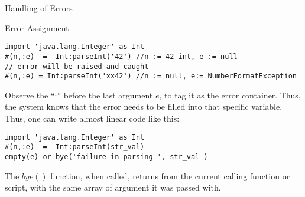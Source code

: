 \begin{section}{Handling of Errors}
\begin{subsection}{Error Assignment}
\begin{lstlisting}[style=JexlStyle]
import 'java.lang.Integer' as Int 
#(n,:e)  =  Int:parseInt('42') //n := 42 int, e := null 
// error will be raised and caught 
#(n,:e) = Int:parseInt('xx42') //n := null, e:= NumberFormatException 
\end{lstlisting}

Observe the ``:'' before the last argument $e$, to tag it as the error container.
Thus, the system knows that the error needs to be filled into that specific variable.
Thus, one can write almost linear code like this:
\begin{center}\begin{minipage}{\linewidth}
\begin{lstlisting}[style=JexlStyle]
import 'java.lang.Integer' as Int 
#(n,:e)  =  Int:parseInt(str_val)
empty(e) or bye('failure in parsing ', str_val )  
\end{lstlisting}
\end{minipage}\end{center}

The $bye()$ function, when called, returns from the current calling function or script,
with the same array of argument it was passed with. 

\end{subsection}
\end{section}

